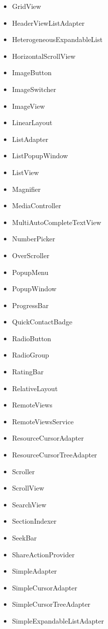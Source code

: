 \documentclass[a4paper,14pt]{extarticle} %
\begin{document}
\begin{itemize}
        \item GridView
        \item HeaderViewListAdapter
        \item HeterogeneousExpandableList
        \item HorizontalScrollView
        \item ImageButton
        \item ImageSwitcher
        \item ImageView
        \item LinearLayout
        \item ListAdapter
        \item ListPopupWindow
        \item ListView
        \item Magnifier
        \item MediaController
        \item MultiAutoCompleteTextView
        \item NumberPicker
        \item OverScroller
        \item PopupMenu
        \item PopupWindow
        \item ProgressBar
        \item QuickContactBadge
        \item RadioButton
        \item RadioGroup
        \item RatingBar
        \item RelativeLayout
        \item RemoteViews
        \item RemoteViewsService
        \item ResourceCursorAdapter
        \item ResourceCursorTreeAdapter
        \item Scroller
        \item ScrollView
        \item SearchView
        \item SectionIndexer
        \item SeekBar
        \item ShareActionProvider
        \item SimpleAdapter
        \item SimpleCursorAdapter
        \item SimpleCursorTreeAdapter
        \item SimpleExpandableListAdapter

\end{itemize}
\end{document}
